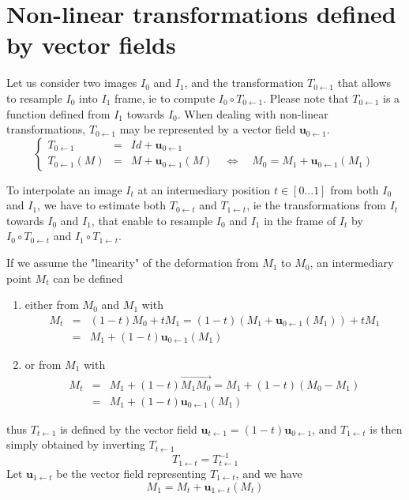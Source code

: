 \section{Non-linear transformations defined by vector fields}

Let us consider two images $I_0$ and $I_1$, and the transformation $T_{0 \leftarrow 1}$ that allows to resample $I_0$ into $I_1$ frame, ie to compute $I_0 \circ T_{0 \leftarrow 1}$. Please note that $T_{0 \leftarrow 1}$ is a function defined from $I_1$ towards $I_0$.
When dealing with non-linear transformations, $T_{0 \leftarrow 1}$ may be represented by a vector field $\mathbf{u}_{0 \leftarrow 1}$.
\begin{displaymath}
\left\{
\begin{array}{lcl}
T_{0 \leftarrow 1} & = & Id + \mathbf{u}_{0 \leftarrow 1} \\
T_{0 \leftarrow 1}(M) & = & M + \mathbf{u}_{0 \leftarrow 1}(M)
\quad \Longleftrightarrow \quad
M_0 = M_1 + \mathbf{u}_{0 \leftarrow 1}(M_1)
\end{array}
\right.
\end{displaymath}

To interpolate an image $I_t$ at an intermediary position $t \in [0 \ldots 1]$ from both $I_0$ and $I_1$, we have to estimate both $T_{0\leftarrow t}$ and $T_{1\leftarrow t}$, ie the transformations from $I_t$ towards $I_0$ and $I_1$, that enable to resample $I_0$ and $I_1$ in the frame of $I_t$ by
$I_0 \circ T_{0\leftarrow t}$ and $I_1 \circ T_{1\leftarrow t}$.

If we assume the "linearity" of the deformation from $M_1$ to $M_0$, an intermediary point $M_t$ can be defined 
\begin{enumerate}
\item either from $M_0$ and $M_1$ with
\begin{eqnarray*}
M_t & = & (1-t) M_0 + t M_1 
=  (1-t) \left( M_1 + \mathbf{u}_{0 \leftarrow 1}(M_1) \right) + t M_1 \\
& = &  M_1 + (1-t) \mathbf{u}_{0 \leftarrow 1}(M_1) 
\end{eqnarray*}
\item or from $M_1$ with
\begin{eqnarray*}
M_t & = & M_1 + (1-t) \overrightarrow{M_1 M_0} 
= M_1 + (1-t) (M_0 - M_1) \\
& = & M_1 + (1-t) \mathbf{u}_{0 \leftarrow 1}(M_1) 
\end{eqnarray*}
\end{enumerate}
thus $T_{t \leftarrow 1}$ is defined by the vector field $\mathbf{u}_{t \leftarrow 1} = (1-t) \mathbf{u}_{0 \leftarrow 1}$, and $T_{1 \leftarrow t}$ is then simply obtained by inverting $T_{t \leftarrow 1}$
\begin{displaymath}
T_{1 \leftarrow t} = T^{-1}_{t \leftarrow 1}
\end{displaymath}
Let $\mathbf{u}_{1 \leftarrow t}$ be the vector field representing $T_{1 \leftarrow t}$, and we have 
\begin{displaymath}
M_1 = M_t + \mathbf{u}_{1 \leftarrow t}(M_t)
\end{displaymath}



